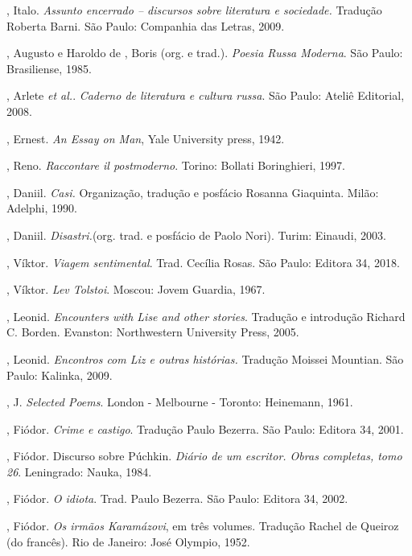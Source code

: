 , Italo. \emph{Assunto encerrado -- discursos sobre literatura e
sociedade.} Tradução Roberta Barni. São Paulo: Companhia das Letras, 2009.

, Augusto e Haroldo de , Boris (org. e trad.).
\emph{Poesia Russa Moderna}. São Paulo: Brasiliense, 1985.

, Arlete \emph{et al.}. \emph{Caderno de literatura e cultura
russa}. São Paulo: Ateliê Editorial, 2008.

, Ernest. \emph{An Essay on Man}, Yale University press, 1942.

, Reno. \emph{Raccontare il postmoderno}. Torino: Bollati Boringhieri,
1997.

, Daniil. \emph{Casi.} Organização, tradução e posfácio Rosanna
Giaquinta. Milão: Adelphi, 1990.

, Daniil. \emph{Disastri.}(org. trad. e posfácio de Paolo Nori). Turim: Einaudi, 2003.

, Víktor. \emph{Viagem sentimental}. Trad. Cecília Rosas. São
Paulo: Editora 34, 2018.

, Víktor. \emph{Lev Tolstoi}. Moscou: Jovem Guardia, 1967.

, Leonid. \emph{Encounters with Lise and other stories}. Tradução e introdução Richard C. Borden. Evanston: Northwestern University Press, 2005.

, Leonid. \emph{Encontros com Liz e outras histórias.} Tradução Moissei Mountian. São Paulo: Kalinka, 2009.

, J. \emph{Selected Poems}. London - Melbourne - Toronto: Heinemann, 1961.

, Fiódor. \emph{Crime e castigo}. Tradução Paulo Bezerra. São Paulo: Editora 34, 2001.

, Fiódor. Discurso sobre Púchkin. \emph{Diário de um escritor. Obras completas, tomo 26}. Leningrado: Nauka, 1984.

, Fiódor. \emph{O idiota}. Trad. Paulo Bezerra. São Paulo:
Editora 34, 2002.

, Fiódor. \emph{Os irmãos Karamázovi}, em três volumes. Tradução Rachel
de Queiroz (do francês). Rio de Janeiro: José Olympio, 1952.

